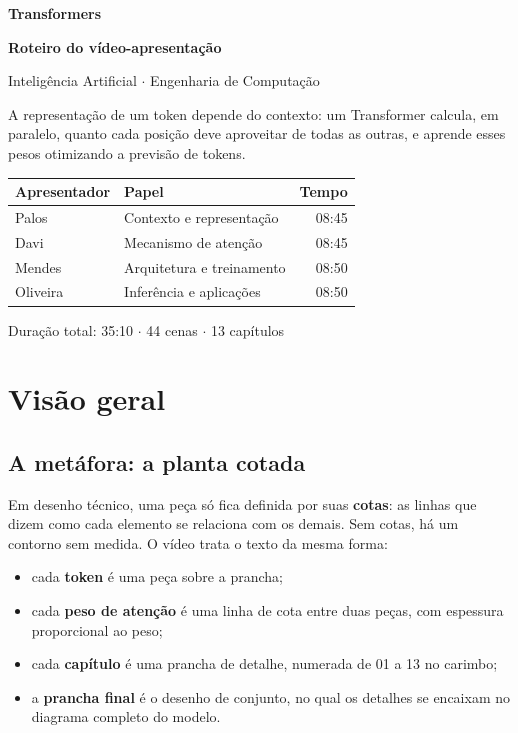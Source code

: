 \documentclass[11pt,a4paper]{article}
\begin{document}
\begin{titlepage}
\vspace*{3cm}
{\fontsize{50}{54}\selectfont\bfseries Transformers\par}
\vspace{8pt}
{\Large\bfseries Roteiro do vídeo-apresentação\par}
{\large Inteligência Artificial $\cdot$ Engenharia de Computação\par}
\vspace{1.6cm}
{\large A representação de um token depende do contexto: um Transformer calcula, em paralelo, quanto cada posição deve aproveitar de todas as outras, e aprende esses pesos otimizando a previsão de tokens.\par}
\vspace{1.6cm}
\begin{tabularx}{\linewidth}{Xlr}
\toprule
\textbf{Apresentador} & \textbf{Papel} & \textbf{Tempo} \\
\midrule
Palos & Contexto e representação & 08:45 \\
Davi & Mecanismo de atenção & 08:45 \\
Mendes & Arquitetura e treinamento & 08:50 \\
Oliveira & Inferência e aplicações & 08:50 \\
\bottomrule
\end{tabularx}
\vfill
{\small\ttfamily\color{grafite}Duração total: 35:10 $\cdot$ 44 cenas $\cdot$ 13 capítulos\par}
\end{titlepage}
\tableofcontents
\clearpage
\section{Visão geral}
\subsection{A metáfora: a planta cotada}
Em desenho técnico, uma peça só fica definida por suas \textbf{cotas}: as linhas que dizem como cada elemento se relaciona com os demais. Sem cotas, há um contorno sem medida. O vídeo trata o texto da mesma forma:

\begin{itemize}
\item cada \textbf{token} é uma peça sobre a prancha;
\item cada \textbf{peso de atenção} é uma linha de cota entre duas peças, com espessura proporcional ao peso;
\item cada \textbf{capítulo} é uma prancha de detalhe, numerada de 01 a 13 no carimbo;
\item a \textbf{prancha final} é o desenho de conjunto, no qual os detalhes se encaixam no diagrama completo do modelo.
\end{itemize}
\end{document}
